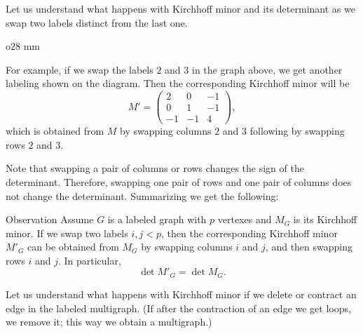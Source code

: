 Let us understand what happens with Kirchhoff minor and its determinant as we swap two labels distinct from the last one.

\begin{wrapfigure}[6]{o}{28 mm}
\end{wrapfigure}

For example, if we swap the labels $2$ and $3$ in the graph above,
we get another labeling shown on the diagram.
Then the corresponding Kirchhoff minor will be 
\[
M'=\left(
\begin{matrix}
2&0&-1
\\
0&1&-1
\\
-1&-1&4
\end{matrix}
\right),
\]
which is obtained from $M$ by swapping columns $2$ and $3$ following by swapping rows $2$ and $3$.

Note that swapping a pair of columns or rows changes the sign of the determinant.
Therefore, swapping one pair of rows and one pair of columns does not change the determinant.
Summarizing we get the following:

\begin{thm}{Observation}\label{observaiton:swap}
Assume $G$ is a labeled graph with $p$ vertexes and $M_G$ is its Kirchhoff minor.
If we swap two labels $i,j<p$, then the corresponding Kirchhoff minor $M'_G$ can be obtained from $M_G$ by swapping columns $i$ and $j$, and then swapping rows $i$ and $j$.
In particular, 
\[\det M'_G=\det M_G.\]

\end{thm}

Let us understand what happens with Kirchhoff minor if we delete or contract an edge in the labeled multigraph.
(If after the contraction of an edge we get loops, we remove it; this way we obtain a multigraph.)

